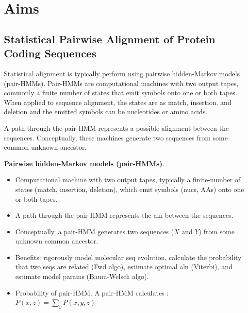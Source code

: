 \section{Aims}

\subsection{Statistical Pairwise Alignment of Protein Coding Sequences}

Statistical alignment is typically perform using pairwise hidden-Markov models
(pair-HMMs).
Pair-HMMs are computational machines with two output tapes, commonly a finite
number of states that emit symbols onto one or both tapes.
When applied to sequence alignment, the states are  as match, insertion, and deletion and the emitted symbols can be
nucleotides or amino acids.

A path through the pair-HMM represents a possible alignment between the
sequences.
Conceptually, these machines generate two sequences from some common unknown
ancestor.



\textbf{Pairwise hidden-Markov models (pair-HMMs)}.
    \begin{itemize}
    \item Computational machine with two output tapes, typically
        a finite-number of states (match, insertion, deletion),
        which emit symbols (nucs, AAs) onto one or both tapes.
    \item A path through the pair-HMM represents the aln between
        the sequences.
    \item Conceptually, a pair-HMM generates two sequences ($X$
        and $Y$) from some unknown common ancestor.
    \item Benefits: rigorously model molecular seq evolution,
        calculate the probability that two seqs are related (Fwd
        algo), estimate optimal aln (Viterbi), and estimate model
        params (Baum-Welsch algo).
    \item Probability of pair-HMM.
        A pair-HMM calculates \parencite{yoon_2009_hmm}:\\
        $P(x,z) = \sum_y P(x,y,z)$
    \end{itemize}

